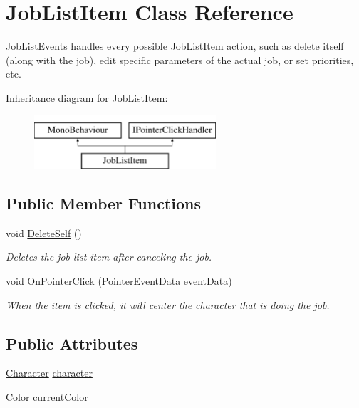 \hypertarget{class_job_list_item}{}\section{Job\+List\+Item Class Reference}
\label{class_job_list_item}


Job\+List\+Events handles every possible \hyperlink{class_job_list_item}{Job\+List\+Item} action, such as delete itself (along with the job), edit specific parameters of the actual job, or set priorities, etc.  


Inheritance diagram for Job\+List\+Item\+:\begin{figure}[H]
\begin{center}
\leavevmode
\includegraphics[height=2.000000cm]{class_job_list_item}
\end{center}
\end{figure}
\subsection*{Public Member Functions}
\begin{DoxyCompactItemize}
\item 
void \hyperlink{class_job_list_item_aaf503eca8ab901394db8c2c3e913ba1e}{Delete\+Self} ()
\begin{DoxyCompactList}\small\item\em Deletes the job list item after canceling the job. \end{DoxyCompactList}\item 
void \hyperlink{class_job_list_item_a2a8d8035d038ab095d9cf79a496619a2}{On\+Pointer\+Click} (Pointer\+Event\+Data event\+Data)
\begin{DoxyCompactList}\small\item\em When the item is clicked, it will center the character that is doing the job. \end{DoxyCompactList}\end{DoxyCompactItemize}
\subsection*{Public Attributes}
\begin{DoxyCompactItemize}
\item 
\hyperlink{class_project_porcupine_1_1_entities_1_1_character}{Character} \hyperlink{class_job_list_item_ac66d008cebd09da086292835db8b6ca7}{character}
\item 
Color \hyperlink{class_job_list_item_ac7b71b8cf12a4400c0b24ca0b318c0c7}{current\+Color}
\end{DoxyCompactItemize}


